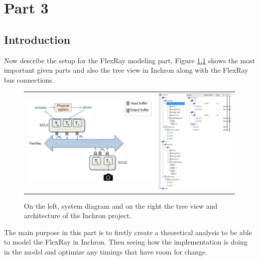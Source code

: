 \chapter{Part 3}

\section{Introduction}

Now describe the setup for the FlexRay modeling part, Figure \ref{fig:FRdia} shows the most important given parts and also the tree view in Inchron along with the FlexRay bus connections.

\begin{figure}[h!]
	\begin{center}
		
			\begin{tabular}{cc}
				\includegraphics[width=0.5\linewidth]{img/FR-diagram} & \includegraphics[width=0.35\linewidth]{img/FR-setup} \\
			\end{tabular}
			\caption{On the left, system diagram and on the right the tree view and architecture of the Inchron project. }
		\label{fig:FRdia}
	\end{center}
\end{figure}

The main purpose in this part is to firstly create a theoretical analysis to be able to model the FlexRay in Inchron. Then seeing how the implementation is doing in the model and optimize any timings that have room for change. 

